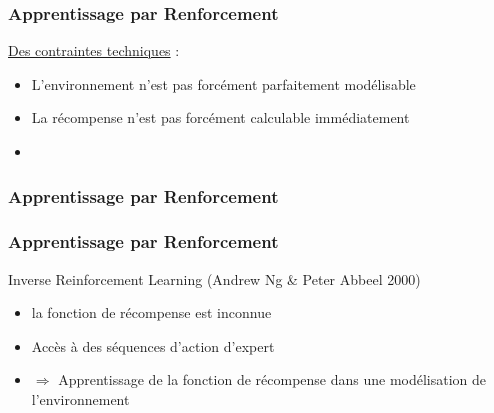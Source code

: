 \documentclass{formation}
\begin{document}
\begin{frame}
  \frametitle{Apprentissage par Renforcement}
  \underline{Des contraintes techniques} :
  \begin{itemize}
  \item L'environnement n'est pas forcément parfaitement modélisable
  \item La récompense n'est pas forcément calculable immédiatement
  \item {}
  \end{itemize}
\end{frame}

\begin{frame}
  \frametitle{Apprentissage par Renforcement}
\end{frame}

\begin{frame}
  \frametitle{Apprentissage par Renforcement}
  Inverse Reinforcement Learning (Andrew Ng \& Peter Abbeel 2000)
  \begin{itemize}
  \item la fonction de récompense est inconnue
  \item Accès à des séquences d'action d'expert
  \item $\Rightarrow$ Apprentissage de la fonction de récompense dans une modélisation de l'environnement
  \end{itemize}
  \href{https://www.youtube.com/watch?v=VCdxqn0fcnE}{}
\end{frame}
\end{document}
